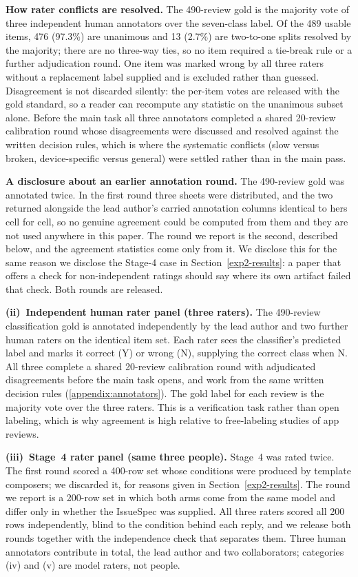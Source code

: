 \documentclass[preprint,12pt]{elsarticle}
\begin{document}
\textbf{How rater conflicts are resolved.} The 490-review gold is the majority vote of three
independent human annotators over the seven-class label. Of the 489 usable items, 476 (97.3\%)
are unanimous and 13 (2.7\%) are two-to-one splits resolved by the majority; there are no
three-way ties, so no item required a tie-break rule or a further adjudication round. One item
was marked wrong by all three raters without a replacement label supplied and is excluded rather
than guessed. Disagreement is not discarded silently: the per-item votes are released with the
gold standard, so a reader can recompute any statistic on the unanimous subset alone. Before the
main task all three annotators completed a shared 20-review calibration round whose
disagreements were discussed and resolved against the written decision rules, which is where the
systematic conflicts (slow versus broken, device-specific versus general) were settled rather
than in the main pass.

\textbf{A disclosure about an earlier annotation round.} The 490-review gold was annotated
twice. In the first round three sheets were distributed, and the two returned alongside the lead
author's carried annotation columns identical to hers cell for cell, so no genuine agreement
could be computed from them and they are not used anywhere in this paper. The round we report is
the second, described below, and the agreement statistics come only from it. We disclose this for
the same reason we disclose the Stage-4 case in Section~\ref{exp2-results}: a paper that offers a
check for non-independent ratings should say where its own artifact failed that check. Both
rounds are released.

\textbf{(ii)~Independent human rater panel (three raters).} The 490-review classification gold is annotated independently by the lead author and two further human raters on the identical item set. Each rater sees the classifier's predicted label and marks it correct (Y) or wrong (N), supplying the correct class when N. All three complete a shared 20-review calibration round with adjudicated disagreements before the main task opens, and work from the same written decision rules (\ref{appendix:annotators}). The gold label for each review is the majority vote over the three raters. This is a verification task rather than open labeling, which is why agreement is high relative to free-labeling studies of app reviews.

\textbf{(iii)~Stage~4 rater panel (same three people).} Stage~4 was rated twice. The first round scored a 400-row set whose conditions were produced by template composers; we discarded it, for reasons given in Section~\ref{exp2-results}. The round we report is a 200-row set in which both arms come from the same model and differ only in whether the IssueSpec was supplied. All three raters scored all 200 rows independently, blind to the condition behind each reply, and we release both rounds together with the independence check that separates them. Three human annotators contribute in total, the lead author and two collaborators; categories (iv) and (v) are model raters, not people.
\end{document}
